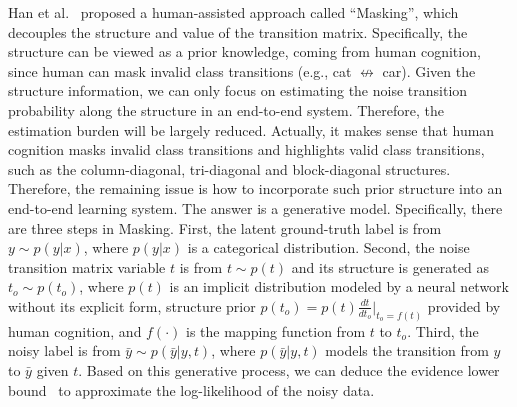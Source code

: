 Han et al.~ proposed a human-assisted approach called ``Masking'', which decouples the structure and value of the transition matrix. Specifically, the structure can be viewed as a prior knowledge, coming from human cognition, since human can mask invalid class transitions (e.g., cat $\nleftrightarrow$ car). Given the structure information, we can only focus on estimating the noise transition probability along the structure in an end-to-end system. 
Therefore, the estimation burden will be largely reduced. Actually, it makes sense that human cognition masks invalid class transitions and highlights valid class transitions, such as the column-diagonal, tri-diagonal and block-diagonal structures. Therefore, the remaining issue is how to incorporate such prior structure into an end-to-end learning system. The answer is a generative model.
Specifically, there are three steps in Masking. 
First, the latent ground-truth label is from $y\sim p(y|x)$, 
where $p(y|x)$ is a categorical distribution. Second, the noise transition matrix variable $t$ is from $t\sim p(t)$  
and its structure 
is generated as $t_o\sim p(t_o)$, 
where $p(t)$ is an implicit distribution modeled by a neural network without its explicit form, structure prior $p(t_o)=p(t)\frac{dt}{dt_o}\big|_{t_o=f(t)}$ provided by human cognition, 
and $f(\cdot)$ is the mapping function from $t$ to $t_o$. 
Third, the noisy label is from $\bar{y}\sim p(\bar{y}|y,t)$, where $p(\bar{y}|y,t)$ models the transition from $y$ to $\bar{y}$ given $t$. Based on this generative process, 
we can deduce the evidence lower bound~
to approximate the log-likelihood of the noisy data.


